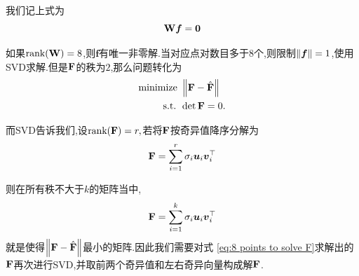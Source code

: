 我们记上式为
\begin{equation}
	\bold{W} \boldsymbol f = \boldsymbol 0
\end{equation}

如果$\text{rank}(\bold{W}) = 8$,则$\bm{f}$有唯一非零解.当对应点对数目多于$8$个,则限制$\left \Vert \boldsymbol f \right \Vert = 1$,使用SVD求解.但是$\bold{F}$的秩为$2$,那么问题转化为
\begin{equation}
	\begin{aligned}
		\text{minimize } &\left \Vert \bold{F} - \hat{\bold{F}} \right \Vert
		\\
		\textup{ s.t. } &  \det{\bold{F}} = 0.
	\end{aligned}
\end{equation}

而SVD告诉我们,设$\text{rank}(\bold{F}) = r,$若将$\bold{F}$按奇异值降序分解为
\begin{equation}
	\bold{F} = \sum_{i=1}^{r} \sigma_i \boldsymbol u_i \boldsymbol v_i^\top
\end{equation}

则在所有秩不大于$k$的矩阵当中,
\begin{equation}
	\bold{F} = \sum_{i=1}^{k} \sigma_i \boldsymbol u_i \boldsymbol v_i^\top
\end{equation}
就是使得$\left \Vert \bold{F} - \hat{\bold{F}} \right \Vert$最小的矩阵.因此我们需要对式 \ref{eq:8 points to solve F}求解出的$\bold{F}$再次进行SVD,并取前两个奇异值和左右奇异向量构成解$\bold{F}$.